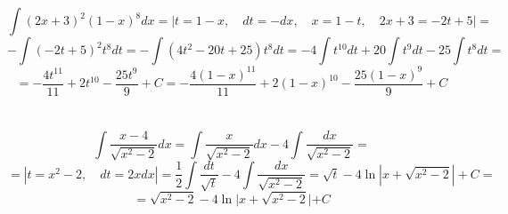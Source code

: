 \section{}
    \[\int (2x + 3)^2 (1 - x)^8 dx = \left|t = 1 - x, \quad dt = -dx,
    \quad x = 1 - t, \quad 2x + 3 = -2t + 5 \right| =\]
    \[- \int (-2t + 5)^2 t^8 dt = - \int (4t^2 - 20t + 25)t^8 dt = 
    -4 \int t^{10} dt + 20 \int t^9 dt - 25 \int t^8 dt =\]
    \[= - \frac{4 t^{11}}{11} + 2 t^{10} - \frac{25 t^9}{9} + C =
    - \frac{4 (1 - x)^{11}}{11} + 2(1 - x)^{10} - \frac{25 (1 - x)^9}{9} + C\]
    
\section{}
    \[\int \frac{x - 4}{\sqrt{x^2 - 2}}dx = \int \frac{x}{\sqrt{x^2 -2}}dx
    - 4 \int \frac{dx}{\sqrt{x^2 - 2}} =\]
    \[= \left|t = x^2 - 2, \quad dt = 2xdx \right| = 
    \frac{1}{2} \int \frac{dt}{\sqrt{t}} - 4 \int \frac{dx}{\sqrt{x^2 - 2}} =
    \sqrt{t} - 4 \ln|x + \sqrt{x^2- 2}| + C = \]
    \[= \sqrt{x^2 - 2} - 4 \ln{|x + \sqrt{x^2 - 2}}| + C\]    